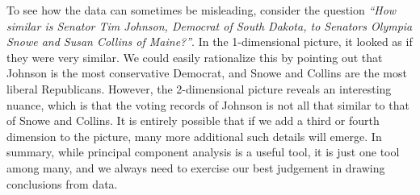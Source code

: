 To see how the data can sometimes be misleading, consider the question
{\em ``How similar is Senator Tim Johnson, Democrat of South Dakota,
  to Senators Olympia Snowe and Susan Collins of Maine?''}. In the
1-dimensional picture, it looked as if they were very similar. We
could easily rationalize this by pointing out that Johnson is the most
conservative Democrat, and Snowe and Collins are the most liberal
Republicans. However, the 2-dimensional picture reveals an interesting
nuance, which is that the voting records of Johnson is not all that
similar to that of Snowe and Collins. It is entirely possible that if
we add a third or fourth dimension to the picture, many more
additional such details will emerge. In summary, while principal
component analysis is a useful tool, it is just one tool among many,
and we always need to exercise our best judgement in drawing
conclusions from data.
